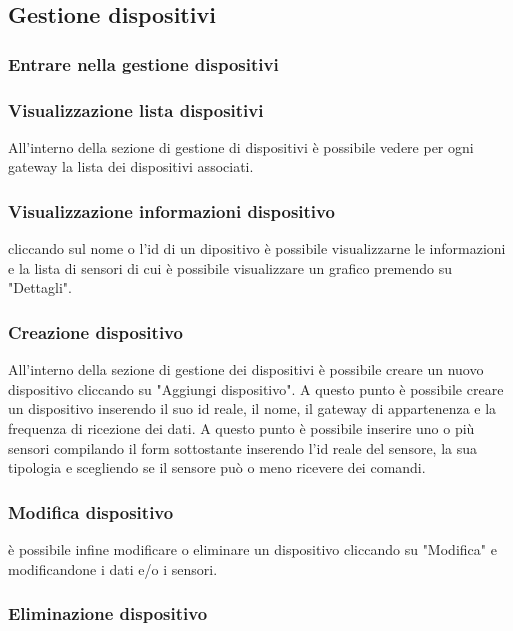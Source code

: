  



\subsection{Gestione dispositivi}

	\subsubsection{Entrare nella gestione dispositivi}

	\subsubsection{Visualizzazione lista dispositivi}
		All'interno della sezione di gestione di dispositivi è possibile vedere per ogni gateway la lista dei dispositivi associati. 

	\subsubsection{Visualizzazione informazioni dispositivo}
		cliccando sul nome o l'id di un dipositivo è possibile visualizzarne le informazioni e la lista di sensori di cui è possibile visualizzare un grafico premendo su "Dettagli".

	\subsubsection{Creazione dispositivo}
		All'interno della sezione di gestione dei dispositivi è possibile creare un nuovo dispositivo cliccando su "Aggiungi dispositivo". A questo punto è possibile creare un dispositivo inserendo il suo id reale, il nome, il gateway di appartenenza e la frequenza di ricezione dei dati. A questo punto è possibile inserire uno o più sensori compilando il form sottostante inserendo l'id reale del sensore, la sua tipologia e scegliendo se il sensore può o meno ricevere dei comandi.

	\subsubsection{Modifica dispositivo}	
		è possibile infine modificare o eliminare un dispositivo cliccando su "Modifica" e modificandone i dati e/o i sensori. 

	\subsubsection{Eliminazione dispositivo}	


